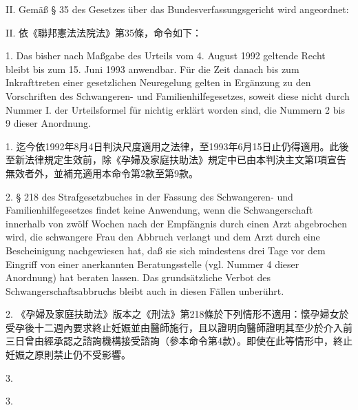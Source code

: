 \documentclass[12pt]{article}
\begin{document}
\begin{sourcepara}[title={原文主文 II. 開頭}]
II. Gemäß § 35 des Gesetzes über das Bundesverfassungsgericht wird angeordnet:
\end{sourcepara}
\begin{transpara}
II. 依《聯邦憲法法院法》第35條，命令如下：
\end{transpara}

\begin{sourcepara}[title={原文主文 II.1}]
1. Das bisher nach Maßgabe des Urteils vom 4. August 1992 geltende Recht bleibt bis zum 15. Juni 1993 anwendbar. Für die Zeit danach bis zum Inkrafttreten einer gesetzlichen Neuregelung gelten in Ergänzung zu den Vorschriften des Schwangeren- und Familienhilfegesetzes, soweit diese nicht durch Nummer I. der Urteilsformel für nichtig erklärt worden sind, die Nummern 2 bis 9 dieser Anordnung.
\end{sourcepara}
\begin{transpara}
1. 迄今依1992年8月4日判決尺度適用之法律，至1993年6月15日止仍得適用。此後至新法律規定生效前，除《孕婦及家庭扶助法》規定中已由本判決主文第I項宣告無效者外，並補充適用本命令第2款至第9款。
\end{transpara}

\begin{sourcepara}[title={原文主文 II.2}]
2. § 218 des Strafgesetzbuches in der Fassung des Schwangeren- und Familienhilfegesetzes findet keine Anwendung, wenn die Schwangerschaft innerhalb von zwölf Wochen nach der Empfängnis durch einen Arzt abgebrochen wird, die schwangere Frau den Abbruch verlangt und dem Arzt durch eine Bescheinigung nachgewiesen hat, daß sie sich mindestens drei Tage vor dem Eingriff von einer anerkannten Beratungsstelle (vgl. Nummer 4 dieser Anordnung) hat beraten lassen. Das grundsätzliche Verbot des Schwangerschaftsabbruchs bleibt auch in diesen Fällen unberührt.
\end{sourcepara}
\begin{transpara}
2. 《孕婦及家庭扶助法》版本之《刑法》第218條於下列情形不適用：懷孕婦女於受孕後十二週內要求終止妊娠並由醫師施行，且以證明向醫師證明其至少於介入前三日曾由經承認之諮詢機構接受諮詢（參本命令第4款）。即使在此等情形中，終止妊娠之原則禁止仍不受影響。
\end{transpara}

\bikeepwithnext[6]
\begin{sourcepara}[title={原文主文 II.3 開頭}]
3.
\end{sourcepara}
\begin{transpara}
3.
\end{transpara}
\end{document}
